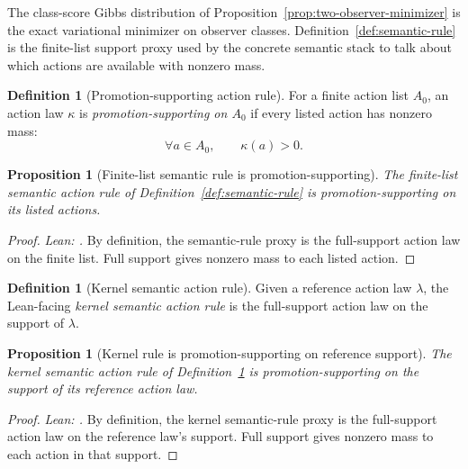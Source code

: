 \documentclass[11pt]{article}
\newtheorem{proposition}[theorem]{Proposition}
\theoremstyle{definition}
\newtheorem{definition}[theorem]{Definition}
\theoremstyle{remark}
\theoremstyle{plain}
\theoremstyle{definition}
\begin{document}
The class-score Gibbs distribution of Proposition~\ref{prop:two-observer-minimizer} is the exact variational minimizer on observer classes. Definition~\ref{def:semantic-rule} is the finite-list support proxy used by the concrete semantic stack to talk about which actions are available with nonzero mass.

\begin{definition}[Promotion-supporting action rule]
\label{def:promotion-supporting}
For a finite action list $A_0$, an action law $\kappa$ is \emph{promotion-supporting on $A_0$} if every listed action has nonzero mass:
\[
\forall a\in A_0,\qquad \kappa(a)>0.
\]
\end{definition}

\begin{proposition}[Finite-list semantic rule is promotion-supporting]
\label{prop:semantic-is-promotion-supporting}
The finite-list semantic action rule of Definition~\ref{def:semantic-rule} is promotion-supporting on its listed actions.
\end{proposition}

\begin{proof}
\noindent\emph{Lean: .}
By definition, the semantic-rule proxy is the full-support action law on the finite list. Full support gives nonzero mass to each listed action.
\end{proof}

\begin{definition}[Kernel semantic action rule]
\label{def:kernel-semantic-rule}
Given a reference action law $\lambda$, the Lean-facing \emph{kernel semantic action rule} is the full-support action law on the support of $\lambda$.
\end{definition}

\begin{proposition}[Kernel rule is promotion-supporting on reference support]
\label{prop:kernel-promotion-support}
The kernel semantic action rule of Definition~\ref{def:kernel-semantic-rule} is promotion-supporting on the support of its reference action law.
\end{proposition}

\begin{proof}
\noindent\emph{Lean: .}
By definition, the kernel semantic-rule proxy is the full-support action law on the reference law's support. Full support gives nonzero mass to each action in that support.
\end{proof}
\end{document}
